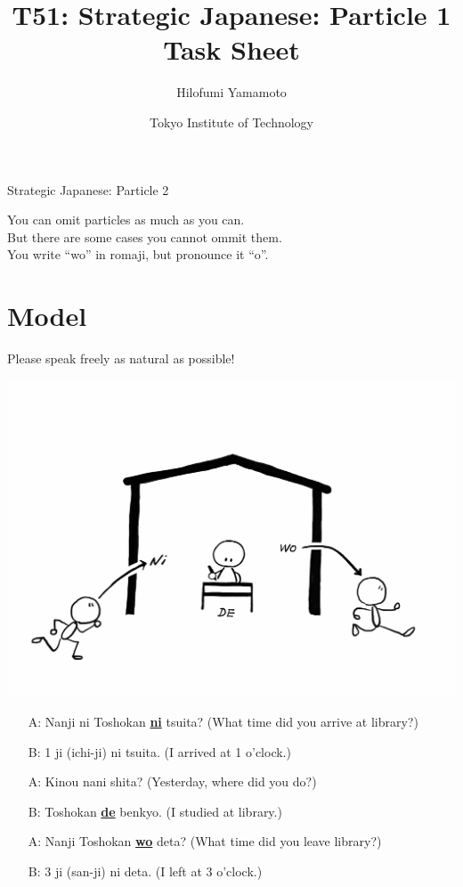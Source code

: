 \documentclass[uplatex,a4paper]{jsarticle}
\title{T51: Strategic Japanese: Particle 1 Task Sheet}
\author{Hilofumi Yamamoto}
\date{Tokyo Institute of Technology}
\begin{document}
\thispagestyle{fancy}

{\noindent\LARGE Strategic Japanese: Particle 2}

\vspace*{.5\baselineskip}


You can omit particles as much as you can.\\
But there are some cases you cannot ommit them.\\
You write ``wo'' in romaji, but pronounce it ``o''.

\section{Model}

Please speak freely as natural as possible! 

\vspace*{-8\baselineskip}

\begin{flushright}
\includegraphics[trim=40 70 70 140, clip, width=.45\hsize]{toshokan-nidewo.pdf}
\end{flushright}

\vspace*{-0\baselineskip}

\begin{itemize}
   \item[A:] Nanji ni Toshokan \underline{{\bfseries ni}} tsuita? (What time did you arrive at library?) 
   \item[B:] 1 ji (ichi-ji) ni tsuita. (I arrived at 1 o'clock.)
   \item[A:] Kinou nani shita? (Yesterday, where did you do?) 
   \item[B:] Toshokan \underline{{\bfseries de}} benkyo. (I studied at library.)
   \item[A:] Nanji Toshokan \underline{{\bfseries wo}} deta? (What time did you leave library?) 
   \item[B:] 3 ji (san-ji) ni deta. (I left at 3 o'clock.)
\end{itemize}
\end{document}
